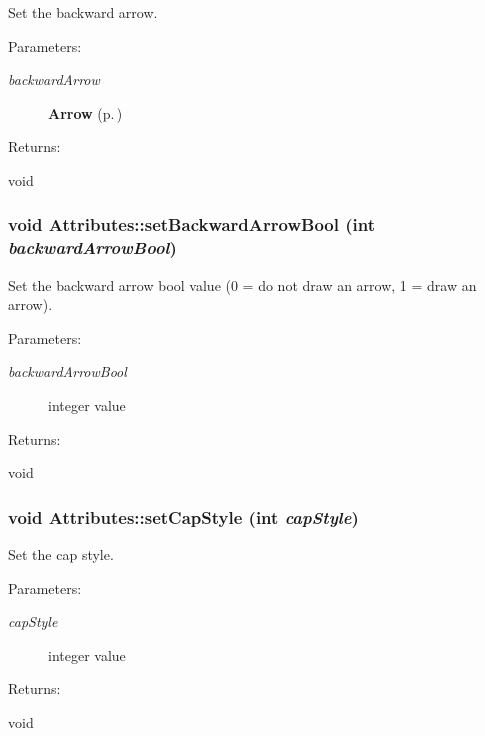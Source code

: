 Set the backward arrow. \begin{Desc}
\item[Parameters: ]\par
\begin{description}
\item[{\em 
backward\-Arrow}]{\bf Arrow} {\rm (p.\,\pageref{classArrow})} \end{description}
\end{Desc}
\begin{Desc}
\item[Returns: ]\par
void \end{Desc}
\subsubsection{\setlength{\rightskip}{0pt plus 5cm}void Attributes::set\-Backward\-Arrow\-Bool (int {\em backward\-Arrow\-Bool})\hspace{0.3cm}{\tt  [inline]}}\label{classAttributes_a14}


Set the backward arrow bool value (0 = do not draw an arrow, 1 = draw an arrow). \begin{Desc}
\item[Parameters: ]\par
\begin{description}
\item[{\em 
backward\-Arrow\-Bool}]integer value \end{description}
\end{Desc}
\begin{Desc}
\item[Returns: ]\par
void \end{Desc}
\subsubsection{\setlength{\rightskip}{0pt plus 5cm}void Attributes::set\-Cap\-Style (int {\em cap\-Style})\hspace{0.3cm}{\tt  [inline]}}\label{classAttributes_a11}


Set the cap style. \begin{Desc}
\item[Parameters: ]\par
\begin{description}
\item[{\em 
cap\-Style}]integer value \end{description}
\end{Desc}
\begin{Desc}
\item[Returns: ]\par
void \end{Desc}
